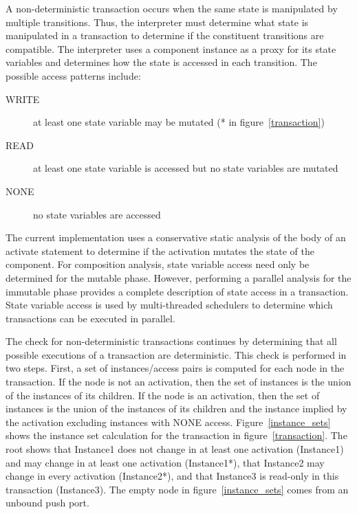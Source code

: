 A non-deterministic transaction occurs when the same state is manipulated by multiple transitions.
Thus, the interpreter must determine what state is manipulated in a transaction to determine if the constituent transitions are compatible.
The interpreter uses a component instance as a proxy for its state variables and determines how the state is accessed in each transition.
The possible access patterns include:
\begin{description}
  \item[WRITE] at least one state variable may be mutated (* in figure~\ref{transaction})
  \item[READ] at least one state variable is accessed but no state variables are mutated
  \item[NONE] no state variables are accessed
\end{description}
The current implementation uses a conservative static analysis of the body of an activate statement to determine if the activation mutates the state of the component.
For composition analysis, state variable access need only be determined for the mutable phase.
However, performing a parallel analysis for the immutable phase provides a complete description of state access in a transaction.
State variable access is used by multi-threaded schedulers to determine which transactions can be executed in parallel.

The check for non-deterministic transactions continues by determining that all possible executions of a transaction are deterministic.
This check is performed in two steps.
First, a set of instances/access pairs is computed for each node in the transaction.
If the node is not an activation, then the set of instances is the union of the instances of its children.
If the node is an activation, then the set of instances is the union of the instances of its children and the instance implied by the activation excluding instances with NONE access.
Figure~\ref{instance_sets} shows the instance set calculation for the transaction in figure~\ref{transaction}.
The root shows that Instance1 does not change in at least one activation (Instance1) and may change in at least one activation (Instance1*), that Instance2 may change in every activation (Instance2*), and that Instance3 is read-only in this transaction (Instance3).
The empty node in figure~\ref{instance_sets} comes from an unbound push port.

